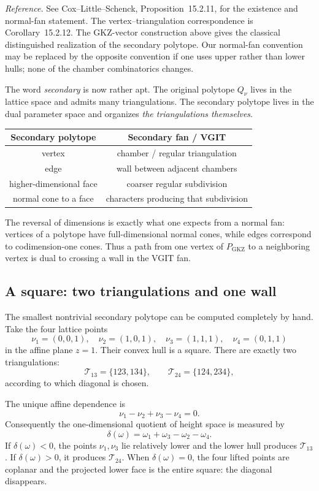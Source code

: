 \noindent
\textit{Reference.}
See Cox--Little--Schenck, Proposition~15.2.11, for the existence and
normal-fan statement.  The vertex--triangulation correspondence is
Corollary~15.2.12.  The GKZ-vector construction above gives the
classical distinguished realization of the secondary polytope.  Our
normal-fan convention may be replaced by the opposite convention if
one uses upper rather than lower hulls; none of the chamber
combinatorics changes.

The word \emph{secondary} is now rather apt.  The original polytope
\(Q_\nu\) lives in the lattice space and admits many triangulations.
The secondary polytope lives in the dual parameter space and organizes
\emph{the triangulations themselves}.

\begin{center}
\small
\begin{tabular}{c|c}
\textbf{Secondary polytope}
&\textbf{Secondary fan / VGIT}
\\
\hline
vertex
&chamber / regular triangulation
\\
edge
&wall between adjacent chambers
\\
higher-dimensional face
&coarser regular subdivision
\\
normal cone to a face
&characters producing that subdivision
\end{tabular}
\end{center}

The reversal of dimensions is exactly what one expects from a normal
fan: vertices of a polytope have full-dimensional normal cones, while
edges correspond to codimension-one cones.  Thus a path from one
vertex of \(P_{\mathrm{GKZ}}\) to a neighboring vertex is dual to
crossing a wall in the VGIT fan.

\subsection{A square: two triangulations and one wall}

The smallest nontrivial secondary polytope can be computed completely
by hand.  Take the four lattice points
\[
\nu_1=(0,0,1),\quad
\nu_2=(1,0,1),\quad
\nu_3=(1,1,1),\quad
\nu_4=(0,1,1)
\]
in the affine plane \(z=1\).  Their convex hull is a square.  There are
exactly two triangulations:
\[
\mathcal T_{13}
=
\{123,134\},
\qquad
\mathcal T_{24}
=
\{124,234\},
\]
according to which diagonal is chosen.

The unique affine dependence is
\[
\nu_1-\nu_2+\nu_3-\nu_4=0.
\]
Consequently the one-dimensional quotient of height space is measured
by
\[
\delta(\omega)
=
\omega_1+\omega_3-\omega_2-\omega_4.
\]
If \(\delta(\omega)<0\), the points \(\nu_1,\nu_3\) lie relatively
lower and the lower hull produces \(\mathcal T_{13}\).  If
\(\delta(\omega)>0\), it produces \(\mathcal T_{24}\).  When
\(\delta(\omega)=0\), the four lifted points are coplanar and the
projected lower face is the entire square: the diagonal disappears.

